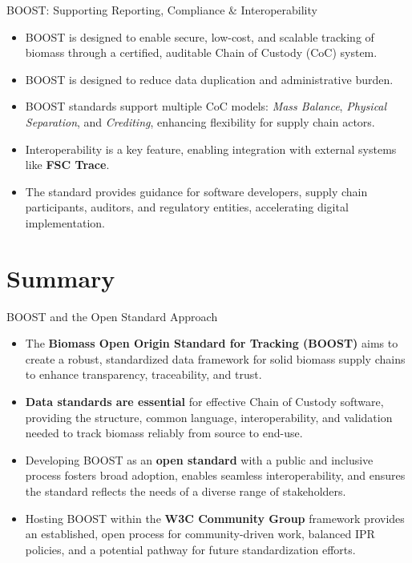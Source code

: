 \documentclass[presentation]{beamer}
\begin{document}
\begin{frame}{BOOST: Supporting Reporting, Compliance \& Interoperability}
\begin{itemize}
    \item BOOST is designed to enable \alert{secure, low-cost, and scalable} tracking of biomass through a certified, auditable Chain of Custody (CoC) system.
    \item BOOST is designed to reduce data duplication and administrative burden.
    \item BOOST standards support multiple CoC models: \textit{Mass Balance}, \textit{Physical Separation}, and \textit{Crediting}, enhancing flexibility for supply chain actors.
    \item Interoperability is a key feature, enabling integration with external systems like \textbf{FSC Trace}.
    \item The standard provides \alert{guidance for software developers, supply chain participants, auditors, and regulatory entities}, accelerating digital implementation.
\end{itemize}
\end{frame}

\section{Summary}
\label{sec:summary}

\begin{frame}{BOOST and the Open Standard Approach}
\begin{itemize}
\item The \textbf{Biomass Open Origin Standard for Tracking (BOOST)} aims to create a robust, standardized data framework for solid biomass supply chains to enhance transparency, traceability, and trust.
\item \textbf{Data standards are essential} for effective Chain of Custody software, providing the structure, common language, interoperability, and validation needed to track biomass reliably from source to end-use.
\item Developing BOOST as an \textbf{open standard} with a public and inclusive process fosters broad adoption, enables seamless interoperability, and ensures the standard reflects the needs of a diverse range of stakeholders.
\item Hosting BOOST within the \textbf{W3C Community Group} framework provides an established, open process for community-driven work, balanced IPR policies, and a potential pathway for future standardization efforts.
\end{itemize}
\end{frame}
\end{document}
